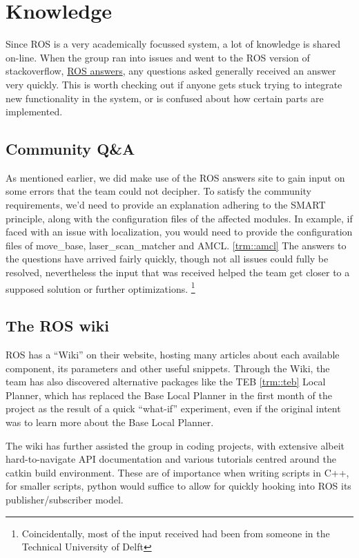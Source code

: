 \section{Knowledge}
Since ROS is a very academically focussed system, a lot of knowledge is shared on-line.
When the group ran into issues and went to the ROS version of stackoverflow, \href{https://answers.ros.org/questions/}{ROS answers}, any questions asked generally received an answer very quickly.
This is worth checking out if anyone gets stuck trying to integrate new functionality in the system, or is confused about how certain parts are implemented.

\subsection{Community Q\&A}
As mentioned earlier, we did make use of the ROS answers site to gain input on some errors that the team could not decipher. 
To satisfy the community requirements, we'd need to provide an explanation adhering to the SMART principle, along with the configuration files of the affected modules.
In example, if faced with an issue with localization, you would need to provide the configuration files of move\_base, laser\_scan\_matcher and AMCL. \ref{trm::amcl}
The answers to the questions have arrived fairly quickly, though not all issues could fully be resolved, nevertheless the input that was  received helped the team get closer to a supposed solution or further optimizations. 
\footnote{Coincidentally, most of the input received had been from someone in the Technical University of Delft}


\subsection{The ROS wiki}
ROS has a ``Wiki'' \cite{site_ros_wiki} on their website, hosting many articles about each available component, its parameters and other useful snippets. 
Through the Wiki, the team has also discovered alternative packages like the TEB \ref{trm::teb} Local Planner, which has replaced the Base Local Planner in the first month of the project as the result of a quick  ``what-if'' experiment, even if the original intent was to learn more about the Base Local Planner.

The wiki has further assisted the group in coding projects, with extensive albeit hard-to-navigate API documentation and various tutorials centred around the catkin build environment. 
These are of importance when writing scripts in C++, for smaller scripts, python would suffice to allow for quickly hooking into ROS its publisher/subscriber model.

\newpage
